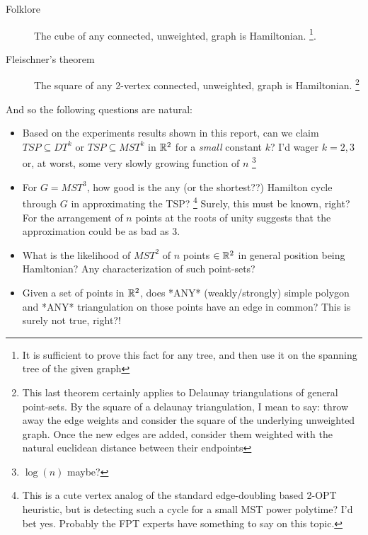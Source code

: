 \begin{appendices}
\begin{description}
     \begin{description}
       \item[Folklore] The cube of any connected, unweighted, graph is Hamiltonian. 
             \footnote{It is sufficient to prove this fact for any tree, and then use it on the spanning tree of the given graph}. 
       \item[Fleischner's theorem  \cite{georgakopoulos2009short}] The square of 
             any 2-vertex connected, unweighted, graph is Hamiltonian. 
          \footnote{This last theorem certainly applies to Delaunay triangulations of general point-sets. By the square of a delaunay triangulation, I mean to say: throw away the edge weights and consider the square of the underlying unweighted graph. Once the new edges are added, consider them weighted with the natural euclidean distance between their endpoints}
     \end{description}

     And so the following questions are natural:

     \begin{itemize}
      \item Based on the experiments results shown in this report, can we 
            claim  $TSP \subseteq DT^{k}$ or $TSP \subseteq MST^{k}$ in $\mathbb{R}^2$ 
           for a \textit{small} constant $k$? I'd wager $k=2,3$ or, at worst, some 
           very slowly growing function of $n$ \footnote{$\log (n)$ maybe?}

      \item For $G=MST^3$, how good is the any (or the shortest??) Hamilton cycle through $G$
            in approximating the TSP? \footnote{This is a cute vertex analog of the standard edge-doubling based 2-OPT heuristic, but is detecting such a cycle for a small MST power polytime? I'd bet yes. Probably the FPT experts have something to say on this topic.}  
            Surely, this must be known, right?  For the arrangement of $n$ points at the roots of unity suggests that the 
            approximation could be as bad as 3. 

       \item What is the likelihood of $MST^2$ of $n$ points $\in \mathbb{R}^2$ in general position being Hamltonian? 
             Any characterization of such point-sets? 

       \item Given a set of points in $\mathbb{R}^2$, does *ANY* 
             (weakly/strongly) simple polygon and *ANY* triangulation on those 
             points have an edge in common? This is surely not true, right?!
      \end{itemize}



\end{description}
\end{appendices}
